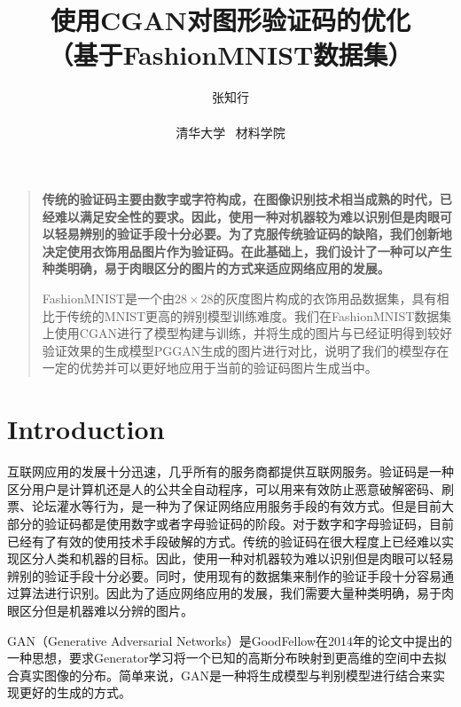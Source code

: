 \documentclass[12pt]{article}
\title{使用CGAN对图形验证码的优化\\ \normalsize{（基于FashionMNIST数据集）}}
\author
{张知行 \\
\\
\normalsize{清华大学 \ 材料学院}\\
}
\date{}
\newenvironment{sciabstract}{%
\begin{quote} \bf}
{\end{quote}}
\begin{document}
 


\baselineskip24pt


\maketitle 




\begin{sciabstract}
    传统的验证码主要由数字或字符构成，在图像识别技术相当成熟的时代，已经难以满足安全性的要求。因此，使用一种对机器较为难以识别但是肉眼可以轻易辨别的验证手段十分必要。为了克服传统验证码的缺陷，我们创新地决定使用衣饰用品图片作为验证码。在此基础上，我们设计了一种可以产生种类明确，易于肉眼区分的图片的方式来适应网络应用的发展。

  FashionMNIST\supercite{DBLP}是一个由$28\times 28$的灰度图片构成的衣饰用品数据集，具有相比于传统的MNIST更高的辨别模型训练难度。我们在FashionMNIST数据集上使用CGAN进行了模型构建与训练，并将生成的图片与已经证明得到较好验证效果的生成模型PGGAN\supercite{DBLP:journals/corr/abs-1710-10196}生成的图片进行对比，说明了我们的模型存在一定的优势并可以更好地应用于当前的验证码图片生成当中。

\end{sciabstract}


\section*{Introduction}

  互联网应用的发展十分迅速，几乎所有的服务商都提供互联网服务。验证码是一种区分用户是计算机还是人的公共全自动程序，可以用来有效防止恶意破解密码、刷票、论坛灌水等行为，是一种为了保证网络应用服务手段的有效方式。但是目前大部分的验证码都是使用数字或者字母验证码的阶段。对于数字和字母验证码，目前已经有了有效的使用技术手段破解的方式\supercite{10.1007}。传统的验证码在很大程度上已经难以实现区分人类和机器的目标。因此，使用一种对机器较为难以识别但是肉眼可以轻易辨别的验证手段十分必要。同时，使用现有的数据集来制作的验证手段十分容易通过算法进行识别。因此为了适应网络应用的发展，我们需要大量种类明确，易于肉眼区分但是机器难以分辨的图片。


 GAN\supercite{NIPS2014_5423}（Generative Adversarial Networks）是GoodFellow在2014年的论文中提出的一种思想，要求Generator学习将一个已知的高斯分布映射到更高维的空间中去拟合真实图像的分布。简单来说，GAN是一种将生成模型与判别模型进行结合来实现更好的生成的方式。
\end{document}
